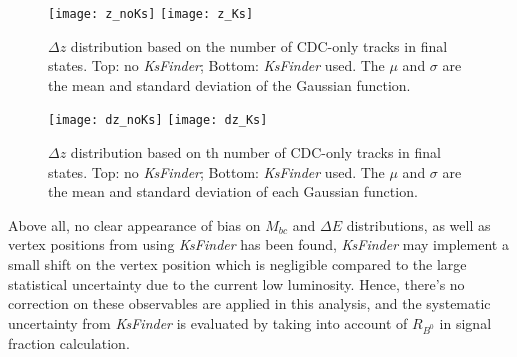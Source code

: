 \begin{figure}[htpb]
	\centering
	\texttt{[image: z\_noKs]}
	\texttt{[image: z\_Ks]}
	\caption{$\Delta z$ distribution based on the number of CDC-only tracks in final states. Top: no \textit{KsFinder}; Bottom: \textit{KsFinder} used. The $\mu$ and $\sigma$ are the mean and standard deviation of the Gaussian function.}
	\label{fig:bias-z}
\end{figure}
\begin{figure}[htpb]
	\centering
	\texttt{[image: dz\_noKs]}
	\texttt{[image: dz\_Ks]}
	\caption{$\Delta z$ distribution based on th number of CDC-only tracks in final states. Top: no \textit{KsFinder}; Bottom: \textit{KsFinder} used. The $\mu$ and $\sigma$ are the mean and standard deviation of each Gaussian function.}
	\label{fig:bias-zerr}
\end{figure}
Above all, no clear appearance of bias on $M_{bc}$ and $\Delta E$ distributions, as well as vertex positions from using \textit{KsFinder} has been found, \textit{KsFinder} may implement a small shift on the vertex position which is negligible compared to the large statistical uncertainty due to the current low luminosity. Hence, there's no correction on these observables are applied in this analysis, and the systematic uncertainty from \textit{KsFinder} is evaluated by taking into account of $R_{B^0}$ in signal fraction calculation.
